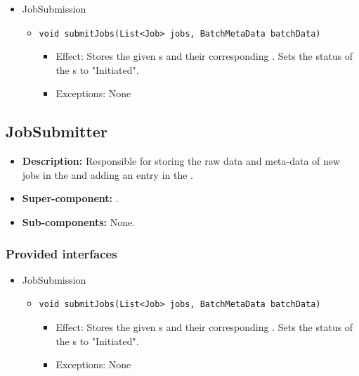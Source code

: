 \begin{itemize}
	\item JobSubmission 
    \begin{itemize}
        \item \texttt{void submitJobs(List<Job> jobs, BatchMetaData batchData)}
        \begin{itemize}
            \item Effect: Stores the given s and their corresponding . Sets the status of the s to "Initiated".
            \item Exceptions: None
        \end{itemize}
    \end{itemize}
\end{itemize}

\subsection{JobSubmitter}
\begin{itemize}
    \item \textbf{Description:} Responsible for storing the raw data and meta-data of new jobs in the  and adding an entry in the .
    \item \textbf{Super-component:} .
    \item \textbf{Sub-components:} None.
\end{itemize}

\subsubsection*{Provided interfaces}
\begin{itemize}
    \item JobSubmission
    \begin{itemize}
        \item \texttt{void submitJobs(List<Job> jobs, BatchMetaData batchData)}
        \begin{itemize}
            \item Effect: Stores the given s and their corresponding . Sets the status of the s to "Initiated".
            \item Exceptions: None
        \end{itemize}
    \end{itemize}
\end{itemize}

